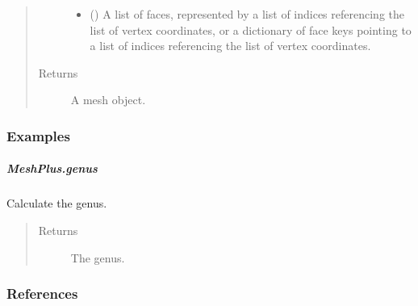 \documentclass[letterpaper,10pt,english]{sphinxmanual}
\begin{document}
\begin{fulllineitems}
\begin{fulllineitems}
\begin{quote}
\begin{description}
\begin{itemize}
\item {} 
 () \textendash{} A list of faces, represented by a list of indices referencing the list of vertex coordinates,
or a dictionary of face keys pointing to a list of indices referencing the list of vertex coordinates.

\end{itemize}

\item[{Returns}] \leavevmode
{} \textendash{} A mesh object.

\end{description}\end{quote}
\subsubsection*{Examples}

\begin{sphinxVerbatim}[commandchars=\\\{\}]
\end{sphinxVerbatim}

\end{fulllineitems}



\subparagraph{MeshPlus.genus}
\label{\detokenize{api/generated/directional_clustering.mesh.MeshPlus.genus:meshplus-genus}}\label{\detokenize{api/generated/directional_clustering.mesh.MeshPlus.genus::doc}}

\begin{fulllineitems}
\label{\detokenize{api/generated/directional_clustering.mesh.MeshPlus.genus:directional_clustering.mesh.MeshPlus.genus}}
Calculate the genus.
\begin{quote}\begin{description}
\item[{Returns}] \leavevmode
{} \textendash{} The genus.

\end{description}\end{quote}
\subsubsection*{References}


\end{fulllineitems}
\end{fulllineitems}
\end{document}
